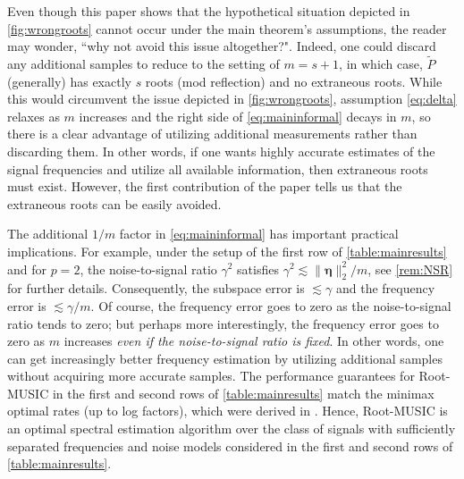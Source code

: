 \documentclass[11pt]{article}
\theoremstyle{definition}
\numberwithin{theorem}{section}
\numberwithin{equation}{section}
\renewcommand{\tilde}{\widetilde}
\newcommand{\bfeta}{{\boldsymbol \eta}}
\numberwithin{equation}{section}
\begin{document}
Even though this paper shows that the hypothetical situation depicted in \cref{fig:wrongroots} cannot occur under the main theorem's assumptions, the reader may wonder, ``why not avoid this issue altogether?". Indeed, one could discard any additional samples to reduce to the setting of $m=s+1$, in which case, $\tilde P$ (generally) has exactly $s$ roots (mod reflection) and no extraneous roots. While this would circumvent the issue depicted in \cref{fig:wrongroots}, assumption \eqref{eq:delta} relaxes as $m$ increases and the right side of \eqref{eq:maininformal} decays in $m$, so there is a clear advantage of utilizing additional measurements rather than discarding them. In other words, if one wants highly accurate estimates of the signal frequencies and utilize all available information, then extraneous roots must exist. However, the first contribution of the paper tells us that the extraneous roots can be easily avoided.

The additional $1/m$ factor in \eqref{eq:maininformal} has important practical implications. For example, under the setup of the first row of \cref{table:mainresults} and for $p=2$, the noise-to-signal ratio $\gamma^2$ satisfies $\gamma^2 \lesssim \|\bfeta\|_2^2/m$, see \cref{rem:NSR} for further details. Consequently, the subspace error is $\lesssim \gamma$ and the frequency error is $\lesssim \gamma/m$. Of course, the frequency error goes to zero as the noise-to-signal ratio tends to zero; but perhaps more interestingly, the frequency error goes to zero as $m$ increases {\it even if the noise-to-signal ratio is fixed}. In other words, one can get increasingly better frequency estimation by utilizing additional samples without acquiring more accurate samples. The performance guarantees for Root-MUSIC in the first and second rows of \cref{table:mainresults}
match the minimax optimal rates (up to log factors), which were derived in \cite{stoica1989music,fannjiang2025optimality}. Hence, Root-MUSIC is an optimal spectral estimation algorithm over the class of signals with sufficiently separated frequencies and noise models considered in the first and second rows of \cref{table:mainresults}. 
\end{document}
